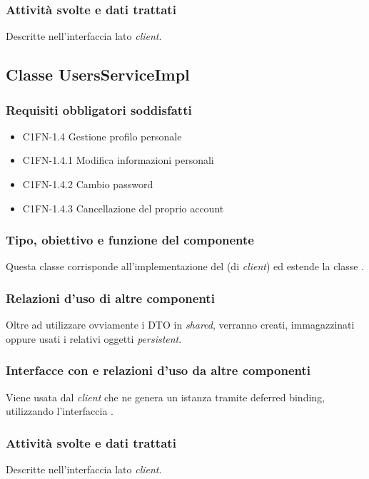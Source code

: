 \subsubsection*{Attivit\`a svolte e dati trattati}
Descritte nell'interfaccia lato \emph{client}.

\subsection{Classe UsersServiceImpl}
\subsubsection*{Requisiti obbligatori soddisfatti}
\begin{itemize}
	\item C1FN-1.4 Gestione profilo personale
	\item C1FN-1.4.1 Modifica informazioni personali
	\item C1FN-1.4.2 Cambio password
	\item C1FN-1.4.3 Cancellazione del proprio account
\end{itemize}
\subsubsection*{Tipo, obiettivo e funzione del componente}
Questa classe corrisponde all'implementazione del  (di
\emph{client}) ed estende la classe .

\subsubsection*{Relazioni d'uso di altre componenti}
Oltre ad utilizzare ovviamente i DTO in \emph{shared}, verranno creati,
immagazzinati oppure usati i relativi oggetti \emph{persistent}.

\subsubsection*{Interfacce con e relazioni d'uso da altre componenti}
Viene usata dal \emph{client} che ne genera un istanza tramite deferred binding,
utilizzando l'interfaccia .

\subsubsection*{Attivit\`a svolte e dati trattati}
Descritte nell'interfaccia lato \emph{client}.

